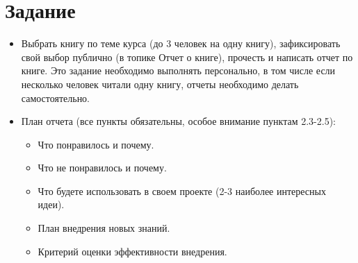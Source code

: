 \documentclass[14pt, russian]{matmex-diploma-custom}
\begin{document}

\maketitle
\section*{Задание}
\begin{itemize}
    \item Выбрать книгу по теме курса (до 3 человек на одну книгу), зафиксировать свой выбор публично (в топике Отчет о книге), прочесть и написать отчет по книге. Это задание необходимо выполнять персонально, в том числе если несколько человек читали одну книгу, отчеты необходимо делать самостоятельно.
    \item План отчета (все пункты обязательны, особое внимание пунктам 2.3-2.5):
    \begin{itemize}
        \item Что понравилось и почему.
        \item Что не понравилось и почему.
        \item Что будете использовать в своем проекте (2-3 наиболее интересных идеи).
        \item План внедрения новых знаний.
        \item Критерий оценки эффективности внедрения.
    \end{itemize}
\end{itemize}
\end{document}
